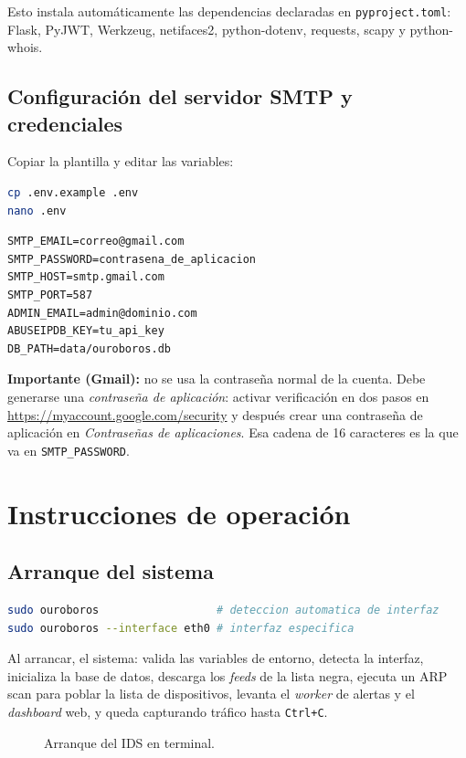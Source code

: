 \documentclass[12pt,letterpaper]{report}
\begin{document}
Esto instala automáticamente las dependencias declaradas en
\texttt{pyproject.toml}: Flask, PyJWT, Werkzeug, netifaces2, python-dotenv,
requests, scapy y python-whois.

\subsection{Configuración del servidor SMTP y credenciales}
\label{sec:smtp}

Copiar la plantilla y editar las variables:
\begin{lstlisting}[language=bash]
cp .env.example .env
nano .env
\end{lstlisting}

\begin{lstlisting}
SMTP_EMAIL=correo@gmail.com
SMTP_PASSWORD=contrasena_de_aplicacion
SMTP_HOST=smtp.gmail.com
SMTP_PORT=587
ADMIN_EMAIL=admin@dominio.com
ABUSEIPDB_KEY=tu_api_key
DB_PATH=data/ouroboros.db
\end{lstlisting}

\textbf{Importante (Gmail):} no se usa la contraseña normal de la cuenta.
Debe generarse una \textit{contraseña de aplicación}: activar verificación en
dos pasos en \url{https://myaccount.google.com/security} y después crear una
contraseña de aplicación en \textit{Contraseñas de aplicaciones}. Esa cadena
de 16 caracteres es la que va en \texttt{SMTP\_PASSWORD}.

\section{Instrucciones de operación}

\subsection{Arranque del sistema}
\begin{lstlisting}[language=bash]
sudo ouroboros                  # deteccion automatica de interfaz
sudo ouroboros --interface eth0 # interfaz especifica
\end{lstlisting}

Al arrancar, el sistema: valida las variables de entorno, detecta la
interfaz, inicializa la base de datos, descarga los \textit{feeds} de la
lista negra, ejecuta un ARP scan para poblar la lista de dispositivos,
levanta el \textit{worker} de alertas y el \textit{dashboard} web, y queda
capturando tráfico hasta \texttt{Ctrl+C}.

\begin{figure}[H]
\centering
{}
\caption{Arranque del IDS en terminal.}
\label{fig:arranque}
\end{figure}
\end{document}
